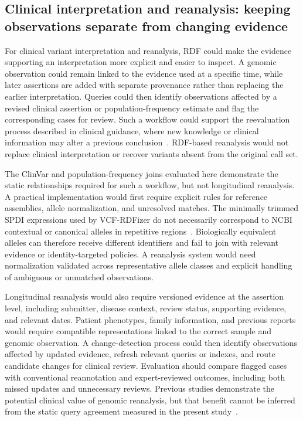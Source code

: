 \documentclass[pdflatex,sn-mathphys-num]{sn-jnl}
\begin{document}
\subsection{Clinical interpretation and reanalysis: keeping observations separate from changing evidence}\label{subsec:disc-reanalysis}
For clinical variant interpretation and reanalysis, RDF could make the evidence supporting an interpretation more explicit and easier to inspect.
A genomic observation could remain linked to the evidence used at a specific time, while later assertions are added with separate provenance rather than replacing the earlier interpretation.
Queries could then identify observations affected by a revised clinical assertion or population-frequency estimate and flag the corresponding cases for review.
Such a workflow could support the reevaluation process described in clinical guidance, where new knowledge or clinical information may alter a previous conclusion~\cite{richards2015standards,deignan2019reevaluation}.
RDF-based reanalysis would not replace clinical interpretation or recover variants absent from the original call set.

The ClinVar and population-frequency joins evaluated here demonstrate the static relationships required for such a workflow, but not longitudinal reanalysis.
A practical implementation would first require explicit rules for reference assemblies, allele normalization, and unresolved matches.
The minimally trimmed SPDI expressions used by VCF-RDFizer do not necessarily correspond to NCBI contextual or canonical alleles in repetitive regions~\cite{holmes2020spdi}.
Biologically equivalent alleles can therefore receive different identifiers and fail to join with relevant evidence or identity-targeted policies.
A reanalysis system would need normalization validated across representative allele classes and explicit handling of ambiguous or unmatched observations.

Longitudinal reanalysis would also require versioned evidence at the assertion level, including submitter, disease context, review status, supporting evidence, and relevant dates.
Patient phenotypes, family information, and previous reports would require compatible representations linked to the correct sample and genomic observation.
A change-detection process could then identify observations affected by updated evidence, refresh relevant queries or indexes, and route candidate changes for clinical review.
Evaluation should compare flagged cases with conventional reannotation and expert-reviewed outcomes, including both missed updates and unnecessary reviews.
Previous studies demonstrate the potential clinical value of genomic reanalysis, but that benefit cannot be inferred from the static query agreement measured in the present study~\cite{hiatt2018systematic}.
\end{document}
